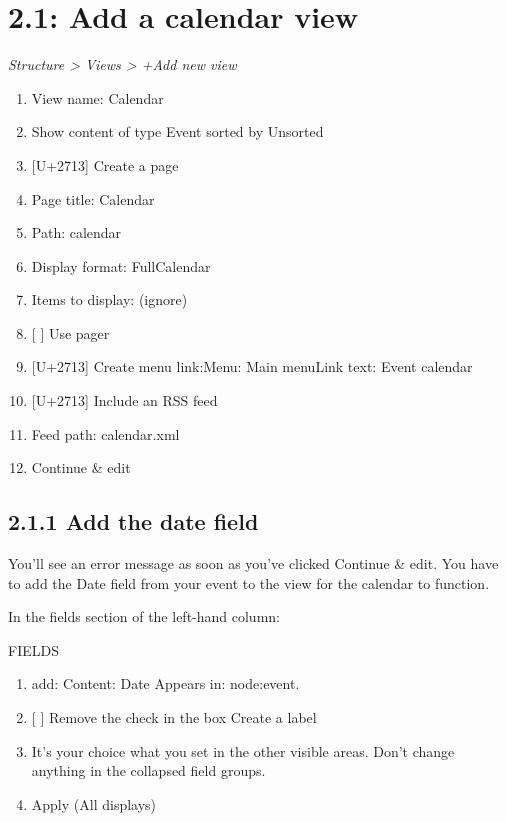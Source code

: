 \documentclass[letterpaper,10pt,english]{sphinxmanual}
\begin{document}
\section{2.1: Add a calendar view}
\label{event_calendar:add-a-calendar-view}
\emph{Structure \textgreater{} Views \textgreater{} +Add new view}
\begin{enumerate}
\item {} 
View name: Calendar

\item {} 
Show content of type Event sorted by Unsorted

\item {} 
{[}U+2713{]} Create a page

\item {} 
Page title: Calendar

\item {} 
Path: calendar

\item {} 
Display format: FullCalendar

\item {} 
Items to display: (ignore)

\item {} 
{[}  {]} Use pager

\item {} 
{[}U+2713{]} Create menu link:Menu: Main menuLink text: Event calendar

\item {} 
{[}U+2713{]} Include an RSS feed

\item {} 
Feed path: calendar.xml

\item {} 
Continue \& edit

\end{enumerate}


\subsection{2.1.1 Add the date field}
\label{event_calendar:add-the-date-field}
You'll see an error message as soon as you've clicked Continue \& edit. You have to add the Date field from your event to the view for the calendar to function.

In the fields section of the left-hand column:

FIELDS
\begin{enumerate}
\item {} 
add:
Content: Date
Appears in: node:event.

\item {} 
{[} {]} Remove the check in the box Create a label

\item {} 
It's your choice what you set in the other visible areas. Don't change anything in the collapsed field groups.

\item {} 
Apply (All displays)

\end{enumerate}
\end{document}
